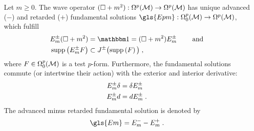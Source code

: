 \begin{lemma}\label{lem:fundamental_solution_wave_operator}
Let $m \geq 0$. The wave operator  $(\square + m^2) : \Omega^p(\mathcal{M}) \to \Omega^p(\mathcal{M})$ has unique advanced ($-$) and retarded ($+$) fundamental solutions $\gls{Epm} : \Omega^p_0(\M) \to \Omega^p(\M)$, which fulfill
\begin{subequations}
\begin{align}
 E_m^\pm (\square + m^2) &= \mathbbm 1 = (\square + m^2) E_m^\pm \formspace \text{\upshape{\quad\quad and}} \label{def:fundamental_solution} \\
 \supp{E_m^\pm F } &\subset J^\pm \big( \supp{F } \big) \formspace, \label{def:fundamental_solution_support}
\end{align}
\end{subequations}
where $F \in \Omega^p_0(\mathcal{M})$ is a test $p$-form.
%
Furthermore, the fundamental solutions commute (or intertwine their action) with the exterior and interior derivative:
\begin{align}
E^\pm_m \delta &= \delta E^\pm_m \\
E^\pm_m d &= d E^\pm_m \;.
\end{align}
%
%
The advanced minus retarded fundamental solution is denoted by
\begin{align}
 \gls{Em} = E^-_m - E^{+}_{m} \formspace.
\end{align}
\end{lemma}
